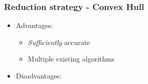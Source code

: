 \begin{frame}
\frametitle{Reduction strategy - Convex Hull}
\begin{multicols}{2}
	\begin{itemize}
		\item Advantages:
		\begin{itemize}
			\item \textit{Sufficiently} accurate
			\item Multiple existing algorithms
		\end{itemize}
	\end{itemize}
\columnbreak
	\begin{itemize}
		\item Disadvantages:
	\end{itemize}
\end{multicols}

\end{frame}